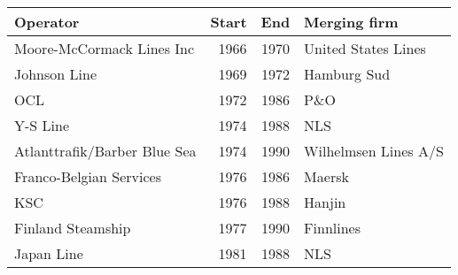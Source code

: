 
\begin{tabular}[t]{lrrl}
\toprule
Operator & Start & End & Merging firm\\
\midrule
Moore-McCormack Lines Inc & 1966 & 1970 & United States Lines\\
Johnson Line & 1969 & 1972 & Hamburg Sud\\
OCL & 1972 & 1986 & P\&O\\
Y-S Line & 1974 & 1988 & NLS\\
Atlanttrafik/Barber Blue Sea & 1974 & 1990 & Wilhelmsen Lines A/S\\
Franco-Belgian Services & 1976 & 1986 & Maersk\\
KSC & 1976 & 1988 & Hanjin\\
Finland Steamship & 1977 & 1990 & Finnlines\\
Japan Line & 1981 & 1988 & NLS\\
\bottomrule
\end{tabular}
